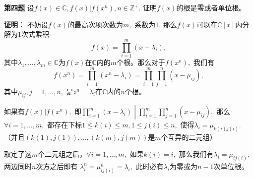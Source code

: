 {\bf 第四题} 设$f(x) \in \mathbb{C}, f(x) | f(x^n), n \in \mathbb{Z}^+.$ 证明$f(x)$的根是零或者单位根。

\ifIncludeAnswer

\newpageorvspace

{\bf 证明}： 不妨设$f(x)$的最高次项次数为$m,$ 系数为$1.$ 那么$f(x)$可以在$\mathbb{C}[x]$内分解为1次式乘积
$$f(x) = \prod\limits_{i=1}^m (x - \lambda_i),$$
其中$\lambda_1, \ldots, \lambda_m \in \mathbb{C}$为$f(x)$在$\mathbb{C}$内的$m$个根。那么对于$f(x^n),$ 我们有
$$f(x^n) = \prod\limits_{i=1}^m (x^n - \lambda_i) = \prod\limits_{i=1}^m \prod\limits_{j=1}^n (x - \mu_{ij}),$$
其中$\mu_{ij}, j = 1, \ldots, n,$ 是$z^n = \lambda_i$在$\mathbb{C}$内的$n$个根。

如果有$f(x) | f(x^n),$ 即$\left.\prod\limits_{i=1}^m (x - \lambda_i) \middle| \prod\limits_{i=1}^m \prod\limits_{j=1}^n (x - \mu_{ij}) \right.,$ 那么$\forall i = 1, \ldots, m,$ 都存在下标$1 \leqslant k(i) \leqslant m, 1 \leqslant j(i) \leqslant n,$ 使得$\lambda_i = \mu_{k(i)j(i)}.$ （并且$(k(1), j(1)), \ldots, (k(m), j(m))$是$m$个互异的二元组）

取定了这$m$个二元组之后，$\forall i = 1, \ldots, m,$ 如果$k(i) = i,$ 那么我们有$\lambda_i = \mu_{ij(i)}.$ 两边同时$n$次方之后即有
$\lambda_i^n = \mu_{ij(i)}^n = \lambda_i,$ 此时必有$\lambda_i$为零或为$n - 1$次单位根。


